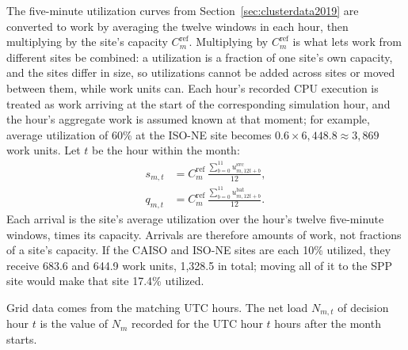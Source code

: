 \documentclass{UNCC-thesis}
\begin{document}
The five-minute utilization curves from
Section~\ref{sec:clusterdata2019} are converted to work by averaging the
twelve windows in each hour, then multiplying by the site's capacity
\(C^{\mathrm{ref}}_m\). Multiplying by \(C^{\mathrm{ref}}_m\) is what lets work from different sites be
combined: a utilization is a fraction of one site's own capacity, and the
sites differ in size, so utilizations cannot be added across sites or moved
between them, while work units can. Each hour's recorded CPU execution is
treated as work
arriving at the start of the corresponding simulation hour, and the hour's
aggregate work is assumed known at that moment; for example, average
utilization of 60\% at the ISO-NE site becomes \(0.6\times6{,}448.8\approx3{,}869\) work
units. Let \(t\) be the hour within the month:
\begin{align}
  s_{m,t}
  &=
  C^{\mathrm{ref}}_m\,
  \frac{\displaystyle\sum_{b=0}^{11} u^{\mathrm{svc}}_{m,12t+b}}{12},
  \label{eq:synthetic-service-arrivals}\\[6pt]
  q_{m,t}
  &=
  C^{\mathrm{ref}}_m\,
  \frac{\displaystyle\sum_{b=0}^{11} u^{\mathrm{bat}}_{m,12t+b}}{12}.
  \label{eq:synthetic-batch-arrivals}
\end{align}
Each arrival is the site's average utilization over the hour's
twelve five-minute windows, times its capacity. Arrivals are
therefore amounts of work, not fractions of a site's capacity. If the CAISO
and ISO-NE sites are each 10\% utilized, they receive 683.6 and 644.9 work
units, 1,328.5 in total; moving all of it to the SPP site would make that site
17.4\% utilized. 

Grid data comes from the matching UTC hours. The net load \(N_{m,t}\) of
decision hour \(t\) is the value of \(N_m\) recorded for the UTC hour \(t\)
hours after the month starts.
\end{document}
